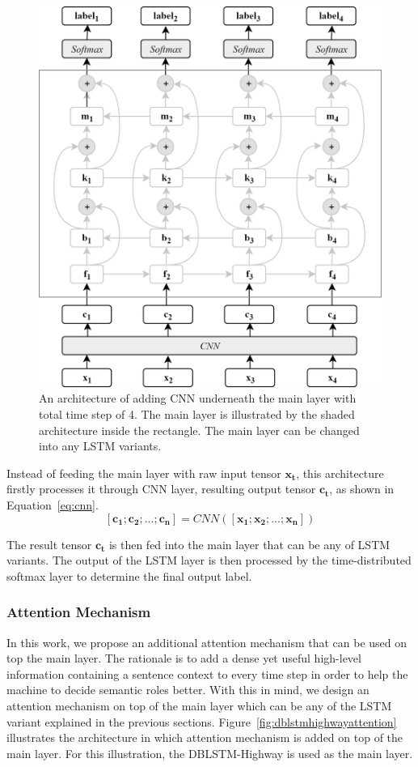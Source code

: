 \begin{figure}
	\centering
	\includegraphics[width=0.75\linewidth]{images/cnndblstmhighway}
	\caption{An architecture of adding CNN underneath the main layer with total time step of 4. The main layer is illustrated by the shaded architecture inside the rectangle. The main layer can be changed into any LSTM variants.}
	\label{fig:cnndblstmhighway}
\end{figure}

Instead of feeding the main layer with raw input tensor $\mathbf{x_{t}}$, this architecture firstly processes it through CNN layer, resulting output tensor $\mathbf{c_{t}}$, as shown in Equation~\ref{eq:cnn}.
\begin{equation}
\label{eq:cnn}
[\mathbf{c_{1}}; \mathbf{c_{2}}; ...; \mathbf{c_{n}}] = CNN([\mathbf{x_{1}}; \mathbf{x_{2}}; ...; \mathbf{x_{n}}])
\end{equation}

The result tensor $\mathbf{c_{t}}$ is then fed into the main layer that can be any of LSTM variants. The output of the LSTM layer is then processed by the time-distributed softmax layer to determine the final output label.

\subsubsection{Attention Mechanism}
In this work, we propose an additional attention mechanism that can be used on top the main layer. The rationale is to add a dense yet useful high-level information containing a sentence context to every time step in order to help the machine to decide semantic roles better. With this in mind, we design an attention mechanism on top of the main layer which can be any of the LSTM variant explained in the previous sections. Figure~\ref{fig:dblstmhighwayattention} illustrates the architecture in which attention mechanism is added on top of the main layer. For this illustration, the DBLSTM-Highway is used as the main layer.

